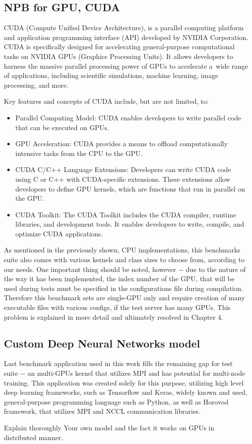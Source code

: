 \subsection{NPB for GPU, CUDA}

CUDA (Compute Unified Device Architecture), is a parallel computing platform
and application programming interface (API) developed by NVIDIA Corporation.
CUDA is specifically designed for accelerating general-purpose computational
tasks on NVIDIA GPUs (Graphics Processing Units). It allows developers to harness
the massive parallel processing power of GPUs to accelerate a~wide range of
applications, including scientific simulations, machine learning, image
processing, and more.

Key features and concepts of CUDA include, but are not limited, to:
\begin{itemize}
    \item Parallel Computing Model: CUDA enables developers to write parallel
    code that can be executed on GPUs.
    \item GPU Acceleration: CUDA provides a means to offload computationally
    intensive tasks from the CPU to the GPU\@.
    \item CUDA C/C++ Language Extensions: Developers can write CUDA code using
    C or C++ with CUDA-specific extensions. These extensions allow developers
    to define GPU kernels, which are functions that run in parallel on the GPU\@.
    \item CUDA Toolkit: The CUDA Toolkit includes the CUDA compiler, runtime
    libraries, and development tools. It enables developers to write, compile,
    and optimize CUDA applications.
\end{itemize}

As mentioned in the previously shown, CPU implementations, this benchmarks
suite also comes with various kernels and class sizes to choose from, according
to our needs. One important thing should be noted, however $-$ due to the
nature of the way it has been implemented, the index number of the GPU, that
will be used during tests must be specified in the configurations file during
compilation. Therefore this benchmark sets are single-GPU only and require
creation of many executable files with various configs, if the test server
has many GPUs. This problem is explained in more detail and ultimately
resolved in Chapter 4.

\subsection{Custom Deep Neural Networks model}

Last benchmark application used in this work fills the remaining gap for test
suite $-$ an multi-GPUs kernel that utilizes MPI and has potential for
multi-node training. This application was created solely for this purpose,
utilizing high level deep learning frameworks, such as Tensorflow and Keras,
widely known and used, general-purpose programming language such as Python,
as well as Horovod~\cite{Horovod} framework, that utilizes MPI and NCCL
communication libraries.


Explain thoroughly Your own model and the fact it works 
on GPUs in distributed manner.